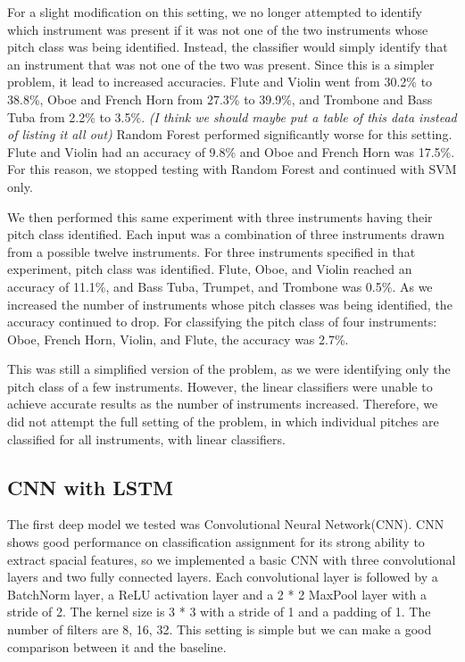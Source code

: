 \documentclass{article}
\begin{document}
For a slight modification on this setting, we no longer attempted to identify which instrument was present if it was not one of the two instruments whose pitch class was being identified. Instead, the classifier would simply identify that an instrument that was not one of the two was present. Since this is a simpler problem, it lead to increased accuracies. Flute and Violin went from 30.2\% to 38.8\%, Oboe and French Horn from 27.3\% to 39.9\%, and Trombone and Bass Tuba from 2.2\% to 3.5\%. \textit{(I think we should maybe put a table of this data instead of listing it all out)} Random Forest performed significantly worse for this setting. Flute and Violin had an accuracy of 9.8\% and Oboe and French Horn was 17.5\%. For this reason, we stopped testing with Random Forest and continued with SVM only.

We then performed this same experiment with three instruments having their pitch class identified. Each input was a combination of three instruments drawn from a possible twelve instruments. For three instruments specified in that experiment, pitch class was identified. Flute, Oboe, and Violin reached an accuracy of 11.1\%, and Bass Tuba, Trumpet, and Trombone was 0.5\%. As we increased the number of instruments whose pitch classes was being identified, the accuracy continued to drop. For classifying the pitch class of four instruments: Oboe, French Horn, Violin, and Flute, the accuracy was 2.7\%.

This was still a simplified version of the problem, as we were identifying only the pitch class of a few instruments. However, the linear classifiers were unable to achieve accurate results as the number of instruments increased. Therefore, we did not attempt the full setting of the problem, in which individual pitches are classified for all instruments, with linear classifiers. 


\subsection{CNN with LSTM}

The first deep model we tested was Convolutional Neural Network(CNN). CNN shows good performance on classification assignment for its strong ability to extract spacial features, so we implemented a basic CNN with three convolutional layers and two fully connected layers. Each convolutional layer is followed by a BatchNorm layer, a ReLU activation layer and a 2 * 2  MaxPool layer with a stride of 2. The kernel size is 3 * 3 with a stride of 1 and a padding of 1. The number of filters are 8, 16, 32. This setting is simple but we can make a good comparison between it and the baseline. 
\end{document}
